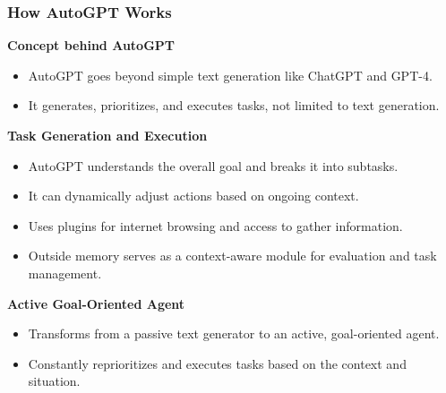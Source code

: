 \begin{frame}[fragile]
\frametitle{How AutoGPT Works}

\textbf{Concept behind AutoGPT}
\begin{itemize}
    \item AutoGPT goes beyond simple text generation like ChatGPT and GPT-4.
    \item It generates, prioritizes, and executes tasks, not limited to text generation.
\end{itemize}

\textbf{Task Generation and Execution}
\begin{itemize}
    \item AutoGPT understands the overall goal and breaks it into subtasks.
    \item It can dynamically adjust actions based on ongoing context.
    \item Uses plugins for internet browsing and access to gather information.
    \item Outside memory serves as a context-aware module for evaluation and task management.
\end{itemize}

\textbf{Active Goal-Oriented Agent}
\begin{itemize}
    \item Transforms from a passive text generator to an active, goal-oriented agent.
    \item Constantly reprioritizes and executes tasks based on the context and situation.
\end{itemize}

\end{frame}

